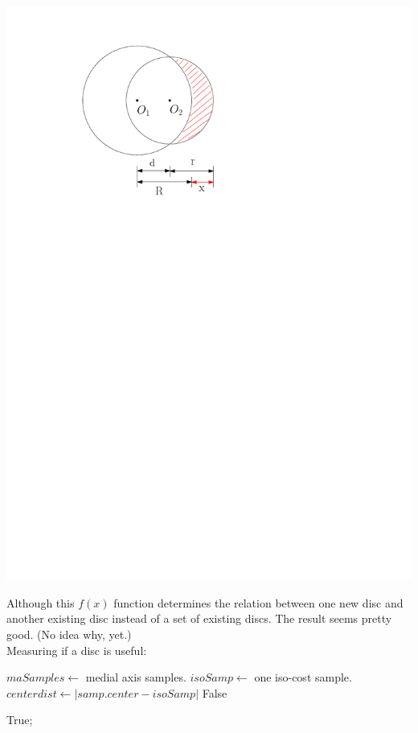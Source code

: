 \documentclass[12pt]{article}
\begin{document}
    \includegraphics[scale=1]{measuring_new_cover.pdf}
	
    Although this $f(x)$ function determines the relation between one new disc and another existing disc instead of a set of existing discs. The result seems pretty good. (No idea why, yet.)\\
	
	
	Measuring if a disc is useful:\\  
  
	\begin{algorithmic}
    \State $maSamples \gets$ medial axis samples.	
	\State $isoSamp \gets$ one iso-cost sample. 
		\State $centerdist \gets |samp.center - isoSamp|$  
			\indent \indent \Return False 
		\EndIf
	\EndFor
	
	\noindent \Return True;
	\end{algorithmic}
	
\end{document}
